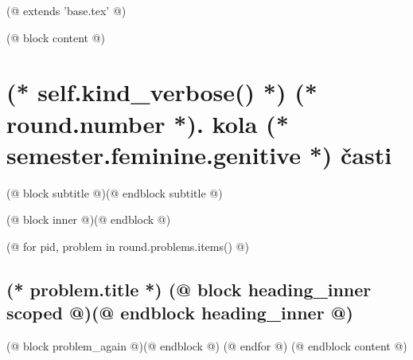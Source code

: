 (@ extends 'base.tex' @)

(@ block content @)
    \thispagestyle{seminar-booklet-first}

    \afterpage{\globaldefs=1\restoregeometry}

    \pagestyle{seminar-booklet-body}


    \section{%
        \texorpdfstring{%
            (* self.kind_verbose() *) (* round.number *). kola (* semester.feminine.genitive *) časti%
        }{%
            (* self.kind_verbose() *)%
        }%
    }
    (@ block subtitle @)(@ endblock subtitle @)

    \setcounter{volume}{(* volume.number *)}
    \setcounter{semester}{(* semester.number *)}
    \setcounter{round}{(* round.number *)}
    \setcounter{section}{(* round.number *)}

    (@ block inner @)(@ endblock @)

    (@ for pid, problem in round.problems.items() @)%
        \setcounter{problem}{(* problem.number *)}%

        \subsection{%
            \texorpdfstring{%
                \large \textbf{(* problem.title *)} \hfill \normalsize%
                (@ block heading_inner scoped @)(@ endblock heading_inner @)
            }{(* round.number *).(* problem.number *) (* problem.title *)}%
        }

        (@ block problem_again @)(@ endblock @)
    (@ endfor @)
(@ endblock content @)
